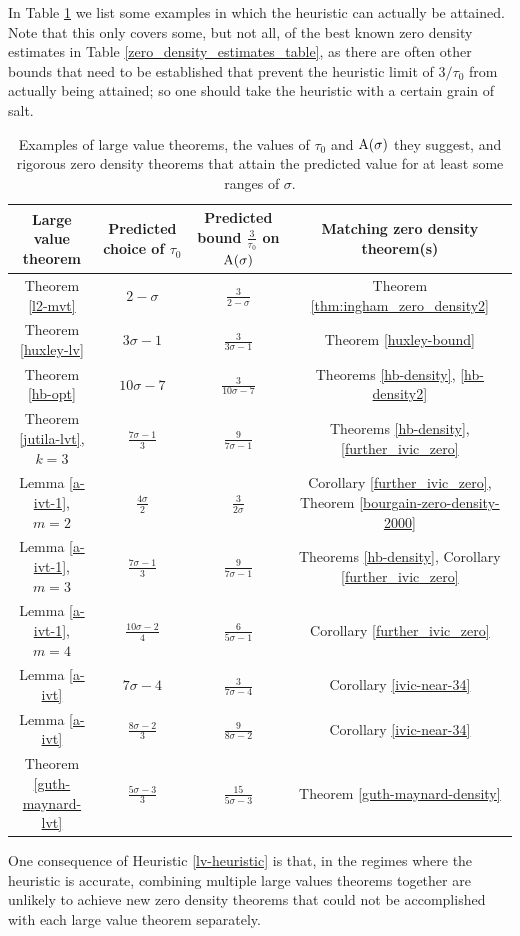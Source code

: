 In Table \ref{zero_density_heuristic} we list some examples in which the heuristic can actually be attained.  Note that this only covers some, but not all, of the best known zero density estimates in Table \ref{zero_density_estimates_table}, as there are often other bounds that need to be established that prevent the heuristic limit of $3/\tau_0$ from actually being attained; so one should take the heuristic with a certain grain of salt.

\begin{table}[ht]
    \def\arraystretch{1.3}
    \centering
    \caption{Examples of large value theorems, the values of $\tau_0$ and $\mathrm{A}(\sigma)$ they suggest, and rigorous zero density theorems that attain the predicted value for at least some ranges of $\sigma$.}
    \begin{tabular}{|c|c|c|c|}
    \hline
    Large value theorem & Predicted choice of $\tau_0$ & Predicted bound $\frac{3}{\tau_0}$ on $\mathrm{A}(\sigma)$ & Matching zero density theorem(s)\\
    \hline
    Theorem \ref{l2-mvt} & $2-\sigma$ & $\frac{3}{2-\sigma}$ & Theorem \ref{thm:ingham_zero_density2}\\
    \hline
    Theorem \ref{huxley-lv} & $3\sigma-1$ & $\frac{3}{3\sigma-1}$ & Theorem \ref{huxley-bound} \\
    \hline
    Theorem \ref{hb-opt} & $10\sigma-7$ & $\frac{3}{10\sigma-7}$ & Theorems \ref{hb-density}, \ref{hb-density2} \\
    \hline
    Theorem \ref{jutila-lvt}, $k=3$ & $\frac{7\sigma-1}{3}$ & $\frac{9}{7\sigma-1}$ & Theorems \ref{hb-density}, \ref{further_ivic_zero} \\
    \hline
    Lemma \ref{a-ivt-1}, $m=2$ & $\frac{4\sigma}{2}$ & $\frac{3}{2\sigma}$ & Corollary \ref{further_ivic_zero}, Theorem \ref{bourgain-zero-density-2000} \\
    \hline
    Lemma \ref{a-ivt-1}, $m=3$ & $\frac{7\sigma-1}{3}$ & $\frac{9}{7\sigma-1}$ & Theorems \ref{hb-density}, Corollary \ref{further_ivic_zero} \\
    \hline
    Lemma \ref{a-ivt-1}, $m=4$ & $\frac{10\sigma-2}{4}$ & $\frac{6}{5\sigma-1}$ & Corollary \ref{further_ivic_zero} \\
    \hline
    Lemma \ref{a-ivt} & $7\sigma-4$ & $\frac{3}{7\sigma-4}$ & Corollary \ref{ivic-near-34} \\
    \hline
    Lemma \ref{a-ivt} & $\frac{8\sigma-2}{3}$ & $\frac{9}{8\sigma-2}$ & Corollary \ref{ivic-near-34} \\
    \hline
    Theorem \ref{guth-maynard-lvt} & $\frac{5\sigma-3}{3}$ & $\frac{15}{5\sigma-3}$ & Theorem \ref{guth-maynard-density} \\
    \hline
    \end{tabular}
    \label{zero_density_heuristic}
    \end{table}

    One consequence of Heuristic \ref{lv-heuristic} is that, in the regimes where the heuristic is accurate, combining multiple large values theorems together are unlikely to achieve new zero density theorems that could not be accomplished with each large value theorem separately.
